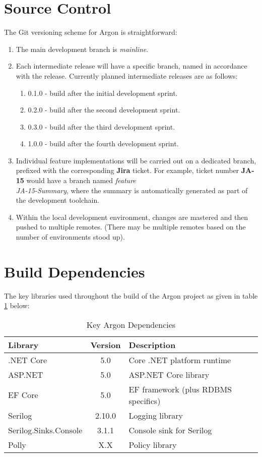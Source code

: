 \documentclass{book}
\begin{document}
\section{Source Control}
The Git versioning scheme for Argon is straightforward:
\begin{enumerate}
    \item The main development branch is \textit{mainline}.
    \item Each intermediate release will have a specific branch, named in accordance with the release.  Currently planned intermediate releases are as follows:
    \begin{enumerate}
        \item 0.1.0 - build after the initial development sprint.
        \item 0.2.0 - build after the second development sprint.
        \item 0.3.0 - build after the third development sprint.
        \item 1.0.0 - build after the fourth development sprint.
    \end{enumerate}
    \item Individual feature implementations will be carried out on a dedicated branch, prefixed with the corresponding \textbf{Jira} ticket.  For example, ticket number \textbf{JA-15} would have a branch named \textit{feature\\JA-15-Summary}, where the summary is automatically generated as part of the development toolchain.
    \item Within the local development environment, changes are mastered and then pushed to multiple remotes.  (There may be multiple remotes based on the number of environments stood up).
\end{enumerate}

\section{Build Dependencies}
The key libraries used throughout the build of the Argon project as given in table \ref{table_dependencies} below:
\begin{table}[h!]
    \centering
    \begin{tabular}{||l | c | l ||}
        \hline
        \textbf{Library} & \textbf{Version} & \textbf{Description} \\
        \hline
        .NET Core & 5.0 & Core .NET platform runtime\\
        ASP.NET & 5.0 & ASP.NET Core library \\
        EF Core & 5.0 & EF framework (plus RDBMS specifics)\\
        Serilog & 2.10.0 & Logging library\\
        Serilog.Sinks.Console & 3.1.1 & Console sink for Serilog \\
        Polly & X.X & Policy library\\
        \hline 
    \end{tabular}
    \caption{Key Argon Dependencies}
    \label{table_dependencies}
\end{table}
\end{document}
